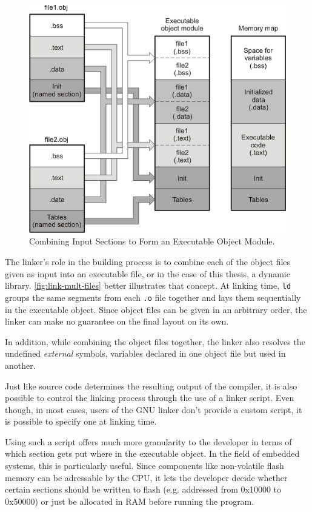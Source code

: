 {\begin{figure}[H]
	\centering 
	\includegraphics[width=.75\linewidth,keepaspectratio]{art/obj-to-elf-to-mem.png}
	\caption{Combining Input Sections to Form an Executable Object Module.\cite{online:linking}}
	\label{fig:link-mult-files}
\end{figure}

The linker's role in the building process is to combine each of the object files given as input into an executable file, or in the case of this thesis, a dynamic library. \autoref{fig:link-mult-files} better illustrates that concept. At linking time, \texttt{ld} groups the same segments from each \texttt{.o} file together and lays them sequentially in the executable object. Since object files can be given in an arbitrary order, the linker can make no guarantee on the final layout on its own.

In addition, while combining the object files together, the linker also resolves the undefined \textit{external} symbols, variables declared in one object file but used in another. 

Just like source code determines the resulting output of the compiler, it is also possible to control the linking process through the use of a linker script\cite{online:ld-scripts}. Even though, in most cases, users of the GNU linker don't provide a custom script, it is possible to specify one at linking time. 

Using such a script offers much more granularity to the developer in terms of which section gets put where in the executable object. In the field of embedded systems, this is particularly useful. Since components like non-volatile flash memory can be adressable by the CPU\cite{online:flash-ram}, it lets the developer decide whether certain sections should be written to flash (e.g. addressed from 0x10000 to 0x50000) or just be allocated in RAM before running the program.

}
